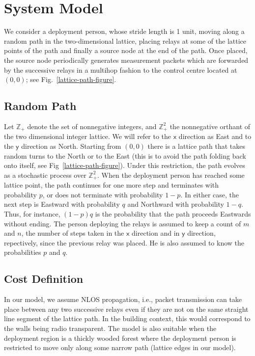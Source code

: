 \documentclass[conference]{IEEEtran}
\begin{document}
\section{System Model} \label{system_model_section} We consider a
deployment person, whose stride length is 1 unit, moving along a
random path in the two-dimensional lattice, placing relays at some of
the lattice points of the path and finally a source node at the end of
the path. Once placed, the source node periodically generates
measurement packets which are forwarded by the successive relays in a
multihop fashion to the control centre located at $(0,0)$; see
Fig.~\ref{lattice-path-figure}.

\subsection{Random Path}

Let $\mathbb{Z}_+$ denote the set of nonnegative integers, and
$\mathbb{Z}_+^2$ the nonnegative orthant of the two dimensional
integer lattice. We will refer to the $\mathsf{x}$ direction as East
and to the $\mathsf{y}$ direction as North. Starting from $(0,0)$
there is a lattice path that takes random turns to the North or to the
East (this is to avoid the path folding back onto itself, see
Fig~\ref{lattice-path-figure}). Under this restriction, the path
evolves as a stochastic process over $\mathbb{Z}_+^2$. When the
deployment person has reached some lattice point, the path continues
for one more step and terminates with probability $p$, or does not
terminate with probability $1-p$. In either case, the next step is
Eastward with probability $q$ and Northward with probability $1-q$.
Thus, for instance, $(1-p)q$ is the probability that the path proceeds
Eastwards without ending. The person deploying the relays is assumed
to keep a count of $m$ and $n$, the number of steps taken in the
$\mathsf{x}$ direction and in $\mathsf{y}$ direction, repectively,
since the previous relay was placed. He is also assumed to know the
probabilities $p$ and $q$.

\subsection{Cost Definition}

In our model, we assume NLOS propagation, i.e., packet transmission can take place between any two 
successive relays even if they are not on the same straight line segment of the lattice path. In the 
building context, this would correspond to the walls being radio transparent. The model is also suitable 
when the deployment region is a thickly wooded forest where the deployment person is restricted to move 
only along some narrow path (lattice edges in our model). 
\end{document}
